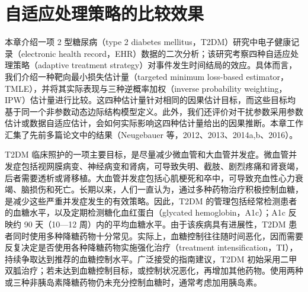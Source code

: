 \chapter{自适应处理策略的比较效果}
\label{ch:adaptive-treatment-comparative-effectiveness}

\begin{sourcebox}
本章介绍一项 2 型糖尿病（type 2 diabetes mellitus，T2DM）研究中电子健康记录（electronic health record，EHR）数据的二次分析；该研究考察四种自适应处理策略（adaptive treatment strategy）对事件发生时间结局的效应。具体而言，我们介绍一种靶向最小损失估计量（targeted minimum loss-based estimator，TMLE），并将其实际表现与三种逆概率加权（inverse probability weighting，IPW）估计量进行比较。这四种估计量针对相同的因果估计目标，而这些目标均基于同一个非参数动态边际结构模型定义。此外，我们还评价对干扰参数采用参数估计或数据自适应估计，会如何实际影响这四种估计量给出的因果推断。本章工作汇集了先前多篇论文中的结果（Neugebauer 等，2012、2013、2014a,b、2016）。
\end{sourcebox}

T2DM 临床照护的一项主要目标，是尽量减少微血管和大血管并发症。微血管并发症包括视网膜病变、神经病变和肾病，可导致失明、截肢、剧烈疼痛和肾衰竭，后者需要透析或肾移植。大血管并发症包括心肌梗死和卒中，可导致充血性心力衰竭、脑损伤和死亡。长期以来，人们一直认为，通过多种药物治疗积极控制血糖，是减少这些严重并发症发生的有效策略。因此，T2DM 的管理包括经常检测患者的血糖水平，以及定期检测糖化血红蛋白（glycated hemoglobin，A1c）；A1c 反映约 90 天（10—12 周）内的平均血糖水平。由于该疾病具有进展性，T2DM 患者同时使用多种降糖药物十分常见。实际上，血糖控制往往随时间恶化，因而需要反复决定是否使用各种降糖药物实施强化治疗（treatment intensification，TI），持续争取达到推荐的血糖控制水平。广泛接受的指南建议，T2DM 初始采用二甲双胍治疗；若未达到血糖控制目标，或控制状况恶化，再增加其他药物。使用两种或三种非胰岛素降糖药物仍未充分控制血糖时，通常考虑加用胰岛素。

